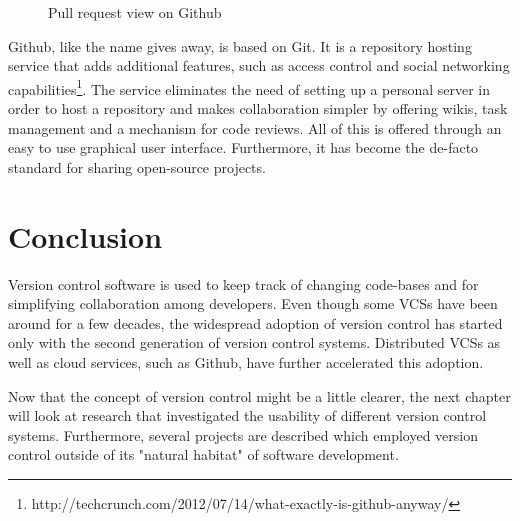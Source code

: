 \begin{figure}[h!]
 \centering
 \caption{Pull request view on Github}
 \label{fig:github-pr}
\end{figure}

Github, like the name gives away, is based on Git. It is a repository hosting service that adds additional features, such as access control and social networking capabilities\footnote{http://techcrunch.com/2012/07/14/what-exactly-is-github-anyway/}. The service eliminates the need of setting up a personal server in order to host a  repository and makes collaboration simpler by offering wikis, task management and a mechanism for code reviews. All of this is offered through an easy to use graphical user interface. Furthermore, it has become the de-facto standard for sharing open-source projects.

\section{Conclusion}
Version control software is used to keep track of changing code-bases and for simplifying collaboration among developers. Even though some VCSs have been around for a few decades, the widespread adoption of version control has started only with the second generation of version control systems. Distributed VCSs as well as cloud services, such as Github, have further accelerated this adoption.

Now that the concept of version control might be a little clearer, the next chapter will look at research that investigated the usability of different version control systems. Furthermore, several projects are described which employed version control outside of its "natural habitat" of software development.



